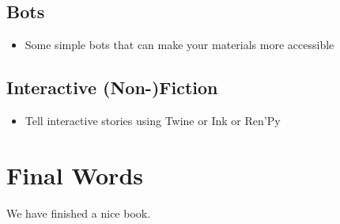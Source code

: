 \documentclass[
]{book}
\providecommand{\tightlist}{%
  \setlength{\itemsep}{0pt}\setlength{\parskip}{0pt}}
\begin{document}
\hypertarget{bots}{%
\section{Bots}\label{bots}}

\begin{itemize}
\tightlist
\item
  Some simple bots that can make your materials more accessible
\end{itemize}

\hypertarget{interactive-stories}{%
\section{Interactive (Non-)Fiction}\label{interactive-stories}}

\begin{itemize}
\tightlist
\item
  Tell interactive stories using Twine or Ink or Ren'Py
\end{itemize}

\hypertarget{final-words}{%
\chapter{Final Words}\label{final-words}}

We have finished a nice book.

  
\end{document}
